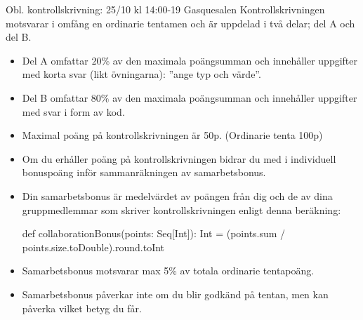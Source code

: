 

\ifkompendium\else



\begin{Slide}{Obl. kontrollskrivning: 25/10 kl 14:00-19 Gasquesalen}\SlideFontSmall
Kontrollskrivningen motsvarar i omfång en  ordinarie tentamen och är uppdelad i två delar; del A och del B. 
\begin{itemize}\SlideFontTiny

\item Del A omfattar $20\%$ av den maximala poängsumman och innehåller uppgifter med korta svar (likt övningarna): ''ange typ och värde''.
\item Del B omfattar $80\%$ av den maximala poängsumman och innehåller uppgifter med svar i form av kod.

\item Maximal poäng på kontrollskrivningen är 50p. (Ordinarie tenta 100p)

\item Om du erhåller  poäng på kontrollskrivningen bidrar du med  i individuell bonuspoäng inför sammanräkningen av samarbetsbonus. 


\item Din samarbetsbonus är medelvärdet av poängen från dig och de av dina gruppmedlemmar som skriver kontrollskrivningen enligt denna beräkning:
\begin{Code}
  def collaborationBonus(points: Seq[Int]): Int =
    (points.sum / points.size.toDouble).round.toInt
\end{Code}

\item Samarbetsbonus motsvarar max 5\% av totala ordinarie tentapoäng.


\item Samarbetsbonus påverkar inte om du blir godkänd på tentan, men kan påverka vilket betyg du får. 


\end{itemize}
\end{Slide}


